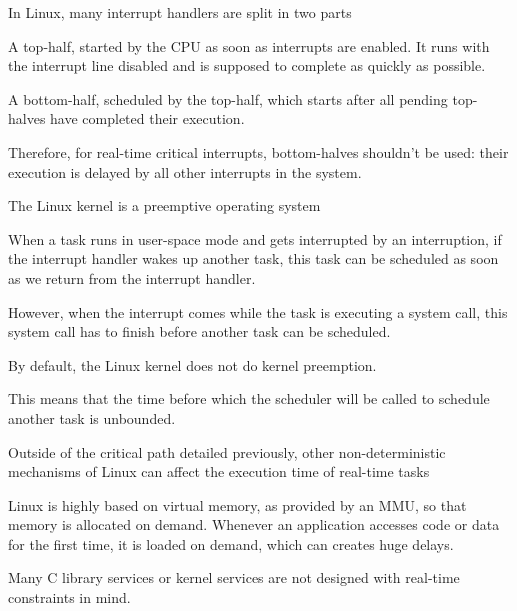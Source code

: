   \startitemize
  \item In Linux, many interrupt handlers are split in two parts
    \startitemize
    \item A top-half, started by the CPU as soon as interrupts are
      enabled. It runs with the interrupt line disabled and is
      supposed to complete as quickly as possible.
    \item A bottom-half, scheduled by the top-half, which starts after
      all pending top-halves have completed their execution.
    \stopitemize
  \item Therefore, for real-time critical interrupts, bottom-halves
    shouldn't be used: their execution is delayed by all other
    interrupts in the system.
  \stopitemize


  \startitemize
  \item The Linux kernel is a preemptive operating system
  \item When a task runs in user-space mode and gets interrupted by an
    interruption, if the interrupt handler wakes up another task, this
    task can be scheduled as soon as we return from the interrupt
    handler.
  \stopitemize

  \startitemize
  \item However, when the interrupt comes while the task is executing
    a system call, this system call has to finish before another task
    can be scheduled.
  \item By default, the Linux kernel does not do kernel preemption.
  \item This means that the time before which the scheduler will be
    called to schedule another task is unbounded.
  \stopitemize


  \startitemize
  \item Outside of the critical path detailed previously, other
    non-deterministic mechanisms of Linux can affect the execution
    time of real-time tasks
  \item Linux is highly based on virtual memory, as provided by an
    MMU, so that memory is allocated on demand. Whenever an
    application accesses code or data for the first time, it is loaded
    on demand, which can creates huge delays.
  \item Many C library services or kernel services are not designed
    with real-time constraints in mind.
  \stopitemize

